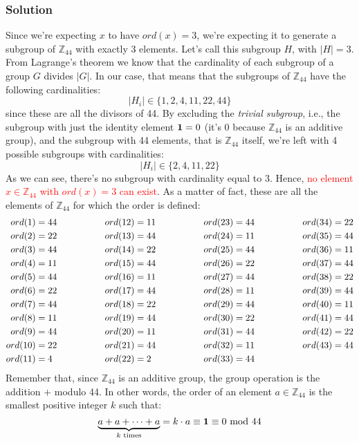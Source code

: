 \subsubsection*{Solution}
Since we're expecting $x$ to have $ord(x)=3$, we're expecting it to generate a subgroup of $\mathbb{Z}_{44}$ with exactly 3 elements. Let's call this subgroup $H$, with $|H|=3$. From Lagrange's theorem we know that the cardinality of each subgroup of a group $G$ divides $|G|$. In our case, that means that the subgroups of $\mathbb{Z}_{44}$ have the following cardinalities:
$$|H_i|\in\{1, 2, 4, 11, 22, 44\}$$
since these are all the divisors of 44. By excluding the \textit{trivial subgroup}, i.e., the subgroup with just the identity element $\textbf{1}=0$ (it's 0 because $\mathbb{Z}_{44}$ is an additive group), and the subgroup with 44 elements, that is $\mathbb{Z}_{44}$ itself, we're left with 4 possible subgroups with cardinalities:
$$|H_i|\in\{2,4,11,22\}$$
As we can see, there's no subgroup with cardinality equal to 3. Hence, \textcolor{red}{no element $x\in\mathbb{Z}_{44}$ with $ord(x)=3$ can exist}. As a matter of fact, these are all the elements of $\mathbb{Z}_{44}$ for which the order is defined:
\begin{alignat*}{4}
    ord(1)&=44\hspace{1.5cm}&&ord(12)=11\hspace{1.5cm}&&ord(23)=44\hspace{1.5cm}&&ord(34)=22\\
    ord(2)&=22&&ord(13)=44&&ord(24)=11&&ord(35)=44\\
    ord(3)&=44&&ord(14)=22&&ord(25)=44&&ord(36)=11\\
    ord(4)&=11&&ord(15)=44&&ord(26)=22&&ord(37)=44\\
    ord(5)&=44&&ord(16)=11&&ord(27)=44&&ord(38)=22\\
    ord(6)&=22&&ord(17)=44&&ord(28)=11&&ord(39)=44\\
    ord(7)&=44&&ord(18)=22&&ord(29)=44&&ord(40)=11\\
    ord(8)&=11&&ord(19)=44&&ord(30)=22&&ord(41)=44\\
    ord(9)&=44&&ord(20)=11&&ord(31)=44&&ord(42)=22\\
    ord(10)&=22&&ord(21)=44&&ord(32)=11&&ord(43)=44\\
    ord(11)&=4&&ord(22)=2&&ord(33)=44
\end{alignat*}
Remember that, since $\mathbb{Z}_{44}$ is an additive group, the group operation is the addition $+$ modulo 44. In other words, the order of an element $a\in\mathbb{Z}_{44}$ is the smallest positive integer $k$ such that:
$$\underbrace{a+a+\cdots+a}_{k\text{ times}}=k\cdot a\equiv\textbf{1}\equiv0\text{ mod }44$$

